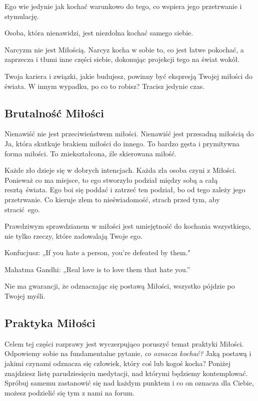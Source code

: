 \documentclass[../dotknieci-miloscia.tex]{subfiles}
\begin{document}
\begin{multicols}{2}
Ego wie jedynie jak kochać warunkowo do tego, co wspiera jego przetrwanie i stymulację.

Osoba, która nienawidzi, jest niezdolna kochać samego siebie.

Narcyzm nie jest Miłością.
Narcyz kocha w sobie to, co jest łatwe pokochać,
a zaprzecza i tłumi inne części siebie, dokonując projekcji tego na świat wokół.

Twoja kariera i związki, jakie budujesz, powinny być ekspresją Twojej miłości do świata.
W innym wypadku, po co to robisz?
Tracisz jedynie czas.


\subsection{Brutalność Miłości}
\label{sztuka/milosc/brutalnosc}

Nienawiść nie jest przeciwieństwem miłości.
Nienawiść jest przesadną miłością do Ja, która skutkuje brakiem miłości do innego.
To bardzo gęsta i prymitywna forma miłości.
To zniekształcona, źle skierowana miłość.

Każde zło dzieje się w dobrych intencjach.
Każda zła osoba czyni z Miłości.
Ponieważ co ma miejsce, to ego stworzyło podział między sobą a całą resztą świata.
Ego boi się poddać i zatrzeć ten podział, bo od tego zależy jego przetrwanie.
Co kieruje złem to nieświadomość, strach przed tym, aby stracić ego.

Prawdziwym sprawdzianem w miłości jest umiejętność do kochania wszystkiego, 
nie tylko rzeczy, które zadowalają Twoje ego.

Konfucjusz: „If you hate a person, you're defeated by them."

Mahatma Gandhi: „Real love is to love them that hate you.”

Nie ma gwarancji, że odznaczając się postawą Miłości, wszystko pójdzie po Twojej myśli.


\end{multicols}
\vspace*{-1.5em}
\ornamentbreak


\subsection{Praktyka Miłości}
\label{sztuka/milosc/praktyka}

Celem tej części rozprawy jest wyczerpująco poruszyć temat praktyki Miłości.
Odpowiemy sobie na fundamentalne pytanie, \emph{co oznacza kochać?}
Jaką postawą i jakimi czynami odznacza się człowiek, który coś lub kogoś kocha?
Poniżej znajdziesz listę parudziesięciu medytacji, nad którymi będziemy kontemplować.
Spróbuj samemu zastanowić się nad każdym punktem i co on oznacza dla Ciebie, 
możesz podzielić się tym z nami na forum.
\end{document}

